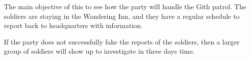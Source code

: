 The main objective of this to see how the party will handle the Gith patrol.
The soldiers are staying in the Wandering Inn, and they have a regular schedule to report back to headquarters with information.

If the party does not successfully fake the reports of the soldiers, then a larger group of soldiers will show up to investigate in three days time.
